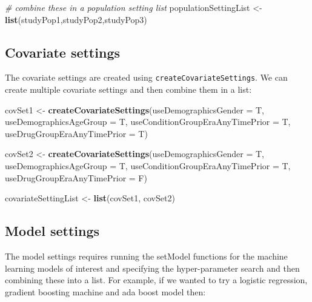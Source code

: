 \documentclass[]{article}
\newenvironment{Shaded}{\begin{snugshade}}{\end{snugshade}}
\newcommand{\KeywordTok}[1]{\textcolor[rgb]{0.13,0.29,0.53}{\textbf{#1}}}
\newcommand{\DataTypeTok}[1]{\textcolor[rgb]{0.13,0.29,0.53}{#1}}
\newcommand{\StringTok}[1]{\textcolor[rgb]{0.31,0.60,0.02}{#1}}
\newcommand{\CommentTok}[1]{\textcolor[rgb]{0.56,0.35,0.01}{\textit{#1}}}
\newcommand{\NormalTok}[1]{#1}
\begin{document}
\begin{Shaded}
\begin{Highlighting}[]
\CommentTok{# combine these in a population setting list}
\NormalTok{populationSettingList <-}\StringTok{ }\KeywordTok{list}\NormalTok{(studyPop1,studyPop2,studyPop3)}
\end{Highlighting}
\end{Shaded}

\subsection{Covariate settings}\label{covariate-settings}

The covariate settings are created using
\texttt{createCovariateSettings}. We can create multiple covariate
settings and then combine them in a list:

\begin{Shaded}
\begin{Highlighting}[]
\NormalTok{covSet1 <-}\StringTok{ }\KeywordTok{createCovariateSettings}\NormalTok{(}\DataTypeTok{useDemographicsGender =}\NormalTok{ T, }
                                   \DataTypeTok{useDemographicsAgeGroup =}\NormalTok{ T, }
                                   \DataTypeTok{useConditionGroupEraAnyTimePrior =}\NormalTok{ T,}
                                   \DataTypeTok{useDrugGroupEraAnyTimePrior =}\NormalTok{ T)}

\NormalTok{covSet2 <-}\StringTok{ }\KeywordTok{createCovariateSettings}\NormalTok{(}\DataTypeTok{useDemographicsGender =}\NormalTok{ T, }
                                   \DataTypeTok{useDemographicsAgeGroup =}\NormalTok{ T, }
                                   \DataTypeTok{useConditionGroupEraAnyTimePrior =}\NormalTok{ T,}
                                   \DataTypeTok{useDrugGroupEraAnyTimePrior =}\NormalTok{ F)}

\NormalTok{covariateSettingList <-}\StringTok{ }\KeywordTok{list}\NormalTok{(covSet1, covSet2)}
\end{Highlighting}
\end{Shaded}

\subsection{Model settings}\label{model-settings}

The model settings requires running the setModel functions for the
machine learning models of interest and specifying the hyper-parameter
search and then combining these into a list. For example, if we wanted
to try a logistic regression, gradient boosting machine and ada boost
model then:
\end{document}

